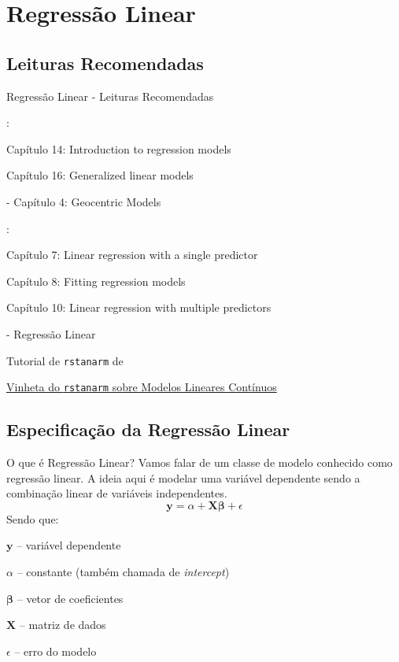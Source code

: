 \section{Regressão Linear}

\subsection{Leituras Recomendadas}
\begin{frame}{Regressão Linear - Leituras Recomendadas}
	\begin{vfilleditems}
		\item \textcite{gelman2013bayesian}:
		\begin{vfilleditems}
			\item Capítulo 14: Introduction to regression models
			\item Capítulo 16: Generalized linear models
		\end{vfilleditems}
		\item \textcite{mcelreath2020statistical} - Capítulo 4: Geocentric Models
		\item \textcite{gelman2020regression}:
		\begin{vfilleditems}
			\item Capítulo 7: Linear regression with a single predictor
			\item Capítulo 8: Fitting regression models
			\item Capítulo 10: Linear regression with multiple predictors
		\end{vfilleditems}
		\item \textcite{storopoli2021estatisticabayesianaR} - Regressão Linear
		\item Tutorial de \texttt{rstanarm} de \textcite{muth2018user}
		\item \href{http://mc-stan.org/rstanarm/articles/continuous.html}{Vinheta do \texttt{rstanarm} sobre Modelos Lineares Contínuos}
	\end{vfilleditems}
\end{frame}

\subsection{Especificação da Regressão Linear}
\begin{frame}{O que é Regressão Linear?}
	Vamos falar de um classe de modelo conhecido como regressão linear.
	A ideia aqui é modelar uma variável dependente sendo a combinação linear de
	variáveis independentes.
	$$
		\boldsymbol{y} = \alpha +  \mathbf{X} \boldsymbol{\beta} + \epsilon
	$$
	Sendo que:
	\begin{vfilleditems}
		\item $\boldsymbol{y}$ -- variável dependente
		\item $\alpha$ -- constante (também chamada de \textit{intercept})
		\item $\boldsymbol{\beta}$ -- vetor de coeficientes
		\item $\mathbf{X}$ -- matriz de dados
		\item $\epsilon$ -- erro do modelo
	\end{vfilleditems}
\end{frame}


